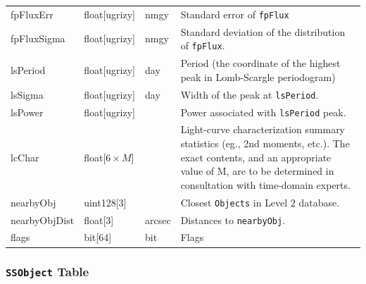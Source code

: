 \documentclass[12pt]{article}
\newcommand{\code}[1]{\texttt{#1}}
\newcommand{\DR}{{Level 2 database}\xspace}
\newcommand{\Objects}{\code{Objects}\xspace}
\newcommand{\SSObject}{\code{SSObject}\xspace}
\begin{document}
\begin{center}
\begin{longtable}{p{3cm}p{2cm}p{2cm}p{5cm}}
fpFluxErr & float[ugrizy] & nmgy & Standard error of {\tt fpFlux} \\ 

fpFluxSigma & float[ugrizy] & nmgy & Standard deviation of the distribution of
{\tt fpFlux}. \\ 

lsPeriod & float[ugrizy] & day & Period (the coordinate of the highest peak in
Lomb-Scargle periodogram) \\

lsSigma  & float[ugrizy] & day & Width of the peak at \texttt{lsPeriod}. \\

lsPower   & float[ugrizy] & ~ & Power associated with \texttt{lsPeriod} peak. \\

lcChar & float[$6\times{}M$] & ~ & Light-curve characterization summary
statistics (eg., 2nd moments, etc.). The exact contents, and an appropriate
value of M, are to be determined in consultation with time-domain experts. \\

nearbyObj   & uint128[3] & ~ & Closest \Objects in \DR. \\

nearbyObjDist   & float[3] & arcsec & Distances to \texttt{nearbyObj}. \\

flags & bit[64] & bit & Flags \\ \hline

\end{longtable}
\end{center}

\subsubsection{\SSObject Table}
\end{document}

